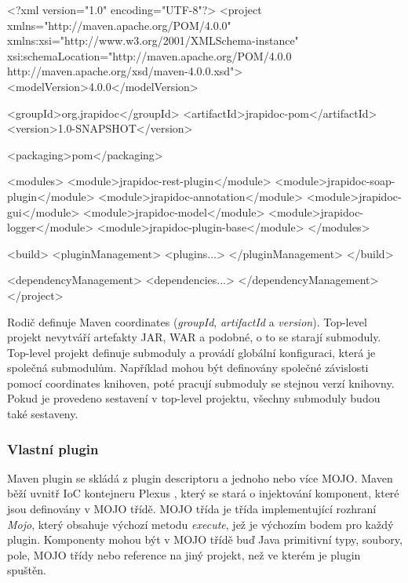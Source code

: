 \documentclass[11pt,twoside,a4paper]{book}
\begin{document}
\begin{code}[frame=single,caption={Ukázka konfigurace multimodulového
projektu}] 
<?xml version="1.0" encoding="UTF-8"?>
<project xmlns="http://maven.apache.org/POM/4.0.0"
         xmlns:xsi="http://www.w3.org/2001/XMLSchema-instance"
         xsi:schemaLocation="http://maven.apache.org/POM/4.0.0
         http://maven.apache.org/xsd/maven-4.0.0.xsd">
    <modelVersion>4.0.0</modelVersion>

    <groupId>org.jrapidoc</groupId>
    <artifactId>jrapidoc-pom</artifactId>
    <version>1.0-SNAPSHOT</version>

    <packaging>pom</packaging>

    <modules>
        <module>jrapidoc-rest-plugin</module>
        <module>jrapidoc-soap-plugin</module>
        <module>jrapidoc-annotation</module>
        <module>jrapidoc-gui</module>
        <module>jrapidoc-model</module>
        <module>jrapidoc-logger</module>
        <module>jrapidoc-plugin-base</module>
    </modules>

    <build>
        <pluginManagement>
            <plugins...>
        </pluginManagement>
    </build>

    <dependencyManagement>
        <dependencies...>
    </dependencyManagement>
</project>
\end{code}

Rodič definuje Maven coordinates ({\em groupId}, {\em artifactId} a {\em
version}).
Top-level projekt nevytváří artefakty JAR, WAR a podobné, o to se starají submoduly. Top-level projekt definuje
submoduly a provádí globální konfiguraci, která je společná submodulům. Například mohou
být definovány společné závislosti pomocí coordinates knihoven, poté pracují submoduly se
stejnou verzí knihovny. Pokud je provedeno sestavení v top-level projektu,
všechny submoduly budou také sestaveny.

\subsubsection{Vlastní plugin}

Maven plugin se skládá z plugin descriptoru a jednoho nebo více MOJO. Maven běží
uvnitř IoC kontejneru Plexus \cite{PlexusHome}, který se stará o injektování komponent,
které jsou definovány v MOJO třídě. MOJO třída je třída implementující rozhraní {\em Mojo},
který obsahuje výchozí metodu {\em execute}, jež je výchozím bodem pro každý
plugin.
Komponenty mohou být v MOJO třídě buď Java primitivní typy, soubory, pole, MOJO
třídy nebo reference na jiný projekt, než ve kterém je plugin spuštěn.
\end{document}
